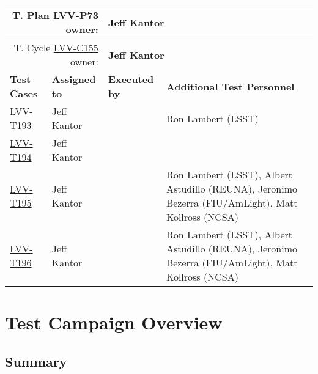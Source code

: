 \documentclass[DM,lsstdraft,STR,toc]{lsstdoc}
\begin{document}
{\small
\begin{longtable}{p{3cm}p{3cm}p{3cm}p{6cm}}
\hline
\multicolumn{2}{r}{T. Plan \href{https://jira.lsstcorp.org/secure/Tests.jspa\#/testPlan/LVV-P73}{LVV-P73} owner:} &
\multicolumn{2}{l}{\textbf{ Jeff Kantor } }\\\hline
\multicolumn{2}{r}{T. Cycle \href{https://jira.lsstcorp.org/secure/Tests.jspa\#/testCycle/LVV-C155}{LVV-C155} owner:} &
\multicolumn{2}{l}{\textbf{
Jeff Kantor }
} \\\hline
\textbf{Test Cases} & \textbf{Assigned to} & \textbf{Executed by} & \textbf{Additional Test Personnel} \\ \hline
\href{https://jira.lsstcorp.org/secure/Tests.jspa#/testCase/LVV-T193}{LVV-T193}
& {\small Jeff Kantor } & {\small  } &
\begin{minipage}[]{6cm}
\smallskip
{\small Ron Lambert (LSST) }
\medskip
\end{minipage}
\\ \hline
\href{https://jira.lsstcorp.org/secure/Tests.jspa#/testCase/LVV-T194}{LVV-T194}
& {\small Jeff Kantor } & {\small  } &
\begin{minipage}[]{6cm}
\smallskip
{\small  }
\medskip
\end{minipage}
\\ \hline
\href{https://jira.lsstcorp.org/secure/Tests.jspa#/testCase/LVV-T195}{LVV-T195}
& {\small Jeff Kantor } & {\small  } &
\begin{minipage}[]{6cm}
\smallskip
{\small Ron Lambert (LSST), Albert Astudillo (REUNA), Jeronimo Bezerra
(FIU/AmLight), Matt Kollross (NCSA) }
\medskip
\end{minipage}
\\ \hline
\href{https://jira.lsstcorp.org/secure/Tests.jspa#/testCase/LVV-T196}{LVV-T196}
& {\small Jeff Kantor } & {\small  } &
\begin{minipage}[]{6cm}
\smallskip
{\small Ron Lambert (LSST), Albert Astudillo (REUNA), Jeronimo Bezerra
(FIU/AmLight), Matt Kollross (NCSA) }
\medskip
\end{minipage}
\\ \hline
\end{longtable}
}

\newpage

\section{Test Campaign Overview}
\label{sect:overview}

\subsection{Summary}
\label{sect:summarytable}
\end{document}
